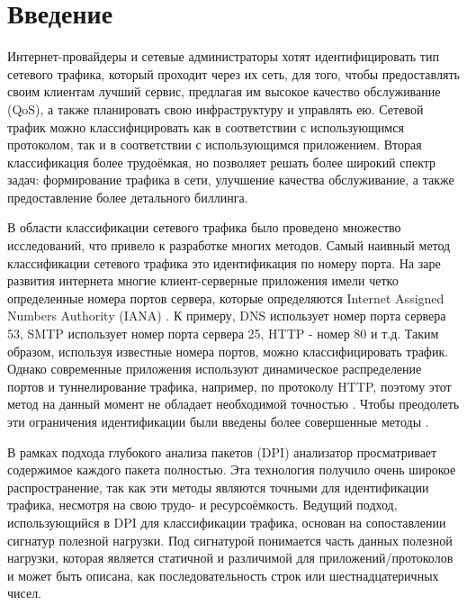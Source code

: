 \section{Введение}
\label{sec:Section0} 

Интернет-провайдеры и сетевые администраторы хотят идентифицировать тип сетевого трафика, который проходит через их сеть, для того,
чтобы предоставлять своим клиентам лучший сервис, предлагая им высокое качество обслуживание (QoS),
а также планировать свою инфраструктуру и управлять ею. Сетевой трафик можно классифицировать как в соответствии с использующимся протоколом,
так и в соответствии с использующимся приложением. Вторая классификация более трудоёмкая, но позволяет решать более широкий спектр задач:
формирование трафика в сети, улучшение качества обслуживание, а также предоставление более детального биллинга.

В области классификации сетевого трафика было проведено множество исследований, что привело к разработке многих методов.
Самый наивный метод классификации сетевого трафика это идентификация по номеру порта.
На заре развития интернета многие клиент-серверные приложения имели четко определенные номера портов сервера,
которые определяются Internet Assigned Numbers Authority (IANA) \cite{IANA}.
К примеру, DNS использует номер порта сервера 53,
SMTP использует номер порта сервера 25, HTTP - номер 80 и т.д.
Таким образом, используя известные номера портов, можно классифицировать трафик.
Однако современные приложения используют динамическое распределение портов и туннелирование трафика, например, по протоколу HTTP,
поэтому этот метод на данный момент не обладает необходимой точностью \cite{dusi2009tunnel}.
Чтобы преодолеть эти ограничения идентификации были введены более совершенные методы \cite{getman2015analys}.

В рамках подхода глубокого анализа пакетов (DPI) анализатор просматривает содержимое каждого пакета полностью.
Эта технология получило очень широкое распространение,
так как эти методы являются точными для идентификации трафика, несмотря на свою трудо- и ресурсоёмкость.
Ведущий подход, использующийся в DPI для классификации трафика, основан на сопоставлении сигнатур полезной нагрузки.
Под сигнатурой понимается часть данных полезной нагрузки,
которая является статичной и различимой для приложений/протоколов и может быть описана, как последовательность строк или шестнадцатеричных чисел.

